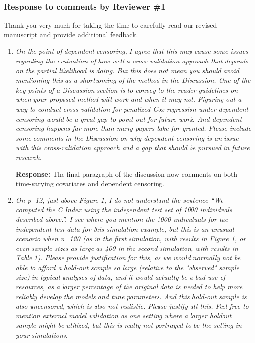 \documentclass{article}
\newcommand{\re}{\textbf{Response: }}
\begin{document}
\subsubsection*{Response to comments by Reviewer \#1}

Thank you very much for taking the time to carefully read our revised manuscript and provide additional feedback.

\begin{enumerate}[align = left]
  
\item \emph{On the point of dependent censoring, I agree that this may cause some issues regarding the evaluation of how well a cross-validation approach that depends on the partial likelihood is doing. But this does not mean you should avoid mentioning this as a shortcoming of the method in the Discussion.  One of the key points of a Discussion section is to convey to the reader guidelines on when your proposed method will work and when it may not. Figuring out a way to conduct cross-validation for penalized Cox regression under dependent censoring would be a great gap to point out for future work.  And dependent censoring happens far more than many papers take for granted. Please include some comments in the Discussion on why dependent censoring is an issue with this cross-validation approach and a gap that should be pursued in future research.}
  
  \re The final paragraph of the discussion now comments on both time-varying covariates and dependent censoring.

\item \emph{On p. 12, just above Figure 1, I do not understand the sentence “We computed the C Index using the independent test set of 1000 individuals described above.”. I see where you mention the 1000 individuals for the independent test data for this simulation example, but this is an unusual scenario when n=120 (as in the first simulation, with results in Figure 1, or even sample sizes as large as 400 in the second simulation, with results in Table 1).  Please provide justification for this, as we would normally not be able to afford a hold-out sample so large (relative to the "observed" sample size) in typical analyses of data, and it would actually be a bad use of resources, as a larger percentage of the original data is needed to help more reliably develop the models and tune parameters. And this hold-out sample is also uncensored, which is also not realistic. Please justify all this. Feel free to mention external model validation as one setting where a larger holdout sample might be utilized, but this is really not portrayed to be the setting in your simulations.}


\end{enumerate}
\end{document}
